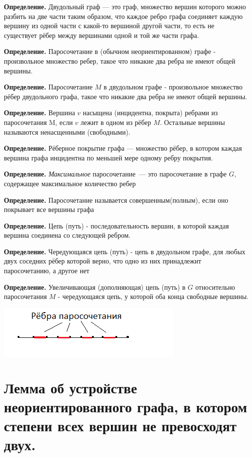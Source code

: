         \textbf{Определение.} Двудольный граф --- это граф, множество вершин которого можно разбить на две части таким образом, что каждое ребро графа соединяет каждую вершину из одной части с какой-то вершиной другой части, то есть не существует рёбер между вершинами одной и той же части графа.

      \textbf{Определение.} Паросочетание в (обычном неориентированном) графе - произвольное множество ребер, такое что никакие два ребра не имеют общей вершины.
    
      \textbf{Определение.} Паросочетание $M$ в двудольном графе - произвольное множество рёбер двудольного графа, такое что никакие два ребра не имеют общей вершины.
      
      \textbf{Определение.} Вершина $v$ насыщена (инцидентна, покрыта) ребрами из паросочетания M, если $v$ лежит в одном из рёбер $M$. Остальные вершины называются ненасщенными (свободными). 
    
      \textbf{Определение.} Рёберное покрытие графа — множество рёбер, в котором каждая вершина графа инцидентна по меньшей мере одному ребру покрытия.
    
      \textbf{Определение.} \textit{Максимальное} паросочетание~--- это паросочетание в графе $G$, содержащее максимальное количество ребер
    
      \textbf{Определение.} Паросочетание называется совершенным(полным), если оно покрывает все вершины графа
      
      \textbf{Определение.} Цепь (путь) - последовательность вершин, в которой каждая вершина соединена со следующей ребром.
    
      \textbf{Определение.} Чередующаяся цепь (путь) - цепь в двудольном графе, для любых двух соседних рёбер которой верно, что одно из них принадлежит паросочетанию, а другое нет
    
      \textbf{Определение.} Увеличивающая (дополняющая) цепь (путь) в $G$ относительно паросочетания $M$ - чередующаяся цепь, у которой оба конца свободные вершины.
      
    \includegraphics[scale=1.5]{images/63-71_цепь.png}
    

\setcounter{section}{64}
\section{Лемма об устройстве неориентированного графа, в котором степени всех вершин не превосходят двух.}

